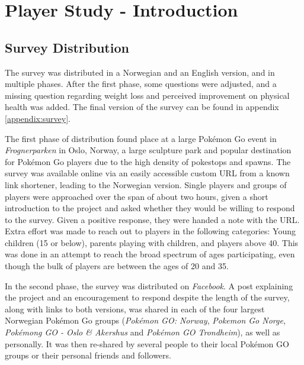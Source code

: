 
\chapter{Player Study - Introduction}

\label{Chapter3}

\section{Survey Distribution}

The survey was distributed in a Norwegian and an English version, and in multiple phases. After the first phase, some questions were adjusted, and a missing question regarding weight loss and perceived improvement on physical health was added. The final version of the survey can be found in appendix \ref{appendix:survey}.

The first phase of distribution found place at a large Pokémon Go event in \emph{Frognerparken} in Oslo, Norway, a large sculpture park and popular destination for Pokémon Go players due to the high density of pokestops and spawns. The survey was available online via an easily accessible custom URL from a known link shortener, leading to the Norwegian version. Single players and groups of players were approached over the span of about two hours, given a short introduction to the project and asked whether they would be willing to respond to the survey. Given a positive response, they were handed a note with the URL. Extra effort was made to reach out to players in the following categories: Young children (15 or below), parents playing with children, and players above 40. This was done in an attempt to reach the broad spectrum of ages participating, even though the bulk of players are between the ages of 20 and 35. 

In the second phase, the survey was distributed on \emph{Facebook}. A post explaining the project and an encouragement to respond despite the length of the survey, along with links to both versions, was shared in each of the four largest Norwegian Pokémon Go groups (\emph{Pokémon GO: Norway}, \emph{Pokemon Go Norge}, \emph{Pokémong GO - Oslo \& Akershus} and \emph{Pokémon GO Trondheim}), as well as personally. It was then re-shared by several people to their local Pokémon GO groups or their personal friends and followers. 

